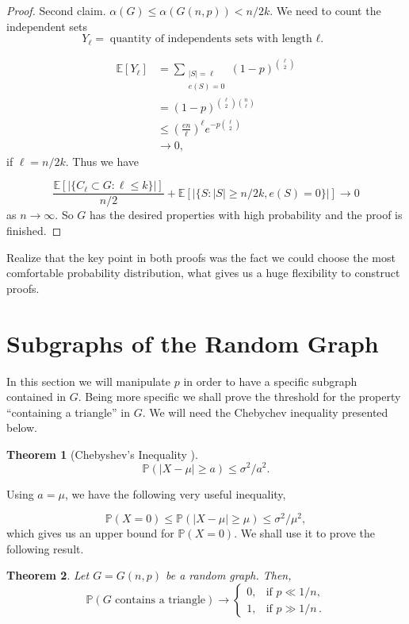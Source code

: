 \documentclass[12pt,twoside,a4paper,bibliography=totocnumbered]{book}
\numberwithin{equation}{section}
\newtheorem{theorem}             {Theorem}[section]
\theoremstyle{remark}
\begin{document}
\begin{proof}
Second claim. $\alpha(G) \leq \alpha (G(n,p)) < n/2k$. We need to count the independent sets
$$Y_{\ell} = \text{quantity of independents sets with length ${\ell}$. }$$

\begin{align*}
\mathbb{E}[Y_{\ell}] &= \sum_{\substack{|S| = {\ell} \\ e(S) = 0 }} (1-p)^{\binom{{\ell}}{2}}\\
	       &= (1-p)^{\binom{{\ell}}{2} \binom{n}{{\ell}}} \\
	       &\leq \left(\frac{en}{{\ell}}\right)^{\ell} e^{-p\binom{{\ell}}{2}}\\
	       &\rightarrow 0,
\end{align*}
if $\ell = n/2k$. Thus we have

$$\frac{\mathbb{E}[|\{C_{\ell} \subset G : {\ell}\leq k \}|]}{n/2} + \mathbb{E} [|\{ S:|S| \geq n/2k, e(S) = 0\}|] \rightarrow 0$$
as $n \rightarrow \infty $. So $G$ has the desired properties with high probability and the proof is finished.
\end{proof}

Realize that the key point in both proofs was the fact we could choose the most comfortable probability distribution, what gives us a huge flexibility to construct proofs.

\section{Subgraphs of the Random Graph}

In this section we will manipulate $p$ in order to have a specific subgraph contained in $G$. Being more specific we shall prove the threshold for the property ``containing a triangle'' in $G$.  We will need the Chebychev inequality presented below.

\begin{theorem}[{Chebyshev's Inequality \cite{Ch67}}]
$$\mathbb{P}(|X-\mu| \geq a) \leq \sigma^2/a^2.$$
\end{theorem} 

Using $a = \mu$, we have the following very useful inequality,

$$\mathbb{P}(X=0) \leq \mathbb{P}(|X-\mu | \geq \mu) \leq \sigma^2/\mu^2,$$
which gives us an upper bound for $\mathbb{P}(X=0)$. We shall use it to prove the following result.\\

\begin{theorem}
Let $G=G(n,p)$ be a random graph.
Then,
$$
\mathbb{P}(G\text{ contains a triangle}) \rightarrow 
\begin{cases}
		0, &\text{if $p\ll 1/n$},\\
		1, &\text{if $p\gg 1/n$}\,.
\end{cases}
$$
\end{theorem}
\end{document}
